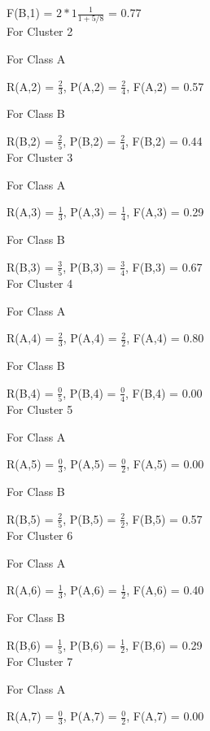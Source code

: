 \documentclass[12pt,english]{article}
\begin{document}
F(B,1) = $2 * 1 \frac{1}{1 + 5/8}$ = 0.77\\
For Cluster 2\par
For Class A\par
R(A,2) = $\frac{2}{3}$, P(A,2) = $\frac{2}{4}$, F(A,2) = 0.57\par
For Class B\par                            
R(B,2) = $\frac{2}{5}$, P(B,2) = $\frac{2}{4}$, F(B,2) = 0.44\\
For Cluster 3\par                          
For Class A\par                            
R(A,3) = $\frac{1}{3}$, P(A,3) = $\frac{1}{4}$, F(A,3) = 0.29\par
For Class B\par                            
R(B,3) = $\frac{3}{5}$, P(B,3) = $\frac{3}{4}$, F(B,3) = 0.67\\
For Cluster 4\par                          
For Class A\par                            
R(A,4) = $\frac{2}{3}$, P(A,4) = $\frac{2}{2}$, F(A,4) = 0.80\par
For Class B\par                            
R(B,4) = $\frac{0}{5}$, P(B,4) = $\frac{0}{4}$, F(B,4) = 0.00\\
For Cluster 5\par                          
For Class A\par                            
R(A,5) = $\frac{0}{3}$, P(A,5) = $\frac{0}{2}$, F(A,5) = 0.00\par
For Class B\par                            
R(B,5) = $\frac{2}{5}$, P(B,5) = $\frac{2}{2}$, F(B,5) = 0.57\\
For Cluster 6\par                          
For Class A\par                            
R(A,6) = $\frac{1}{3}$, P(A,6) = $\frac{1}{2}$, F(A,6) = 0.40\par
For Class B\par                            
R(B,6) = $\frac{1}{5}$, P(B,6) = $\frac{1}{2}$, F(B,6) = 0.29\\
For Cluster 7\par                          
For Class A\par                            
R(A,7) = $\frac{0}{3}$, P(A,7) = $\frac{0}{2}$, F(A,7) = 0.00\par
\end{document}
